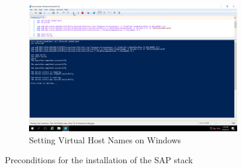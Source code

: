 \begin{figure}[!htb]\ContinuedFloat
    \begin{subfigure}{\textwidth}
        \captionsetup{width=0.8\linewidth}
        \includegraphics[width=0.9\linewidth]{img/Methodologie/Precondition6.png}
        \centering
        \caption{Setting Virtual Host Names on Windows}
    \end{subfigure}
    \caption[Preconditions SAP]{Preconditions for the installation of the SAP stack}
    \label{fig:Preconditions}
\end{figure}
\clearpage

